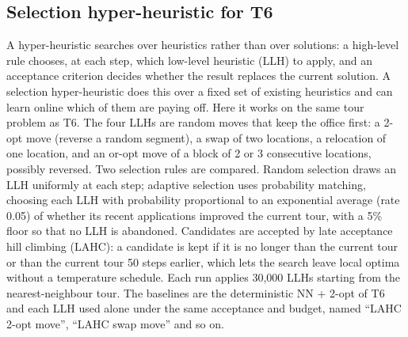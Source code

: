 \subsection{Selection hyper-heuristic for T6}\label{sec:hh-design}
A hyper-heuristic searches over heuristics rather than over solutions: a high-level rule chooses, at each step, which low-level heuristic (LLH) to apply, and an acceptance criterion decides whether the result replaces the current solution. A selection hyper-heuristic does this over a fixed set of existing heuristics and can learn online which of them are paying off. Here it works on the same tour problem as T6. The four LLHs are random moves that keep the office first: a 2-opt move (reverse a random segment), a swap of two locations, a relocation of one location, and an or-opt move of a block of 2 or 3 consecutive locations, possibly reversed. Two selection rules are compared. Random selection draws an LLH uniformly at each step; adaptive selection uses probability matching, choosing each LLH with probability proportional to an exponential average (rate 0.05) of whether its recent applications improved the current tour, with a 5\% floor so that no LLH is abandoned. Candidates are accepted by late acceptance hill climbing (LAHC): a candidate is kept if it is no longer than the current tour or than the current tour 50 steps earlier, which lets the search leave local optima without a temperature schedule. Each run applies 30,000 LLHs starting from the nearest-neighbour tour. The baselines are the deterministic NN + 2-opt of T6 and each LLH used alone under the same acceptance and budget, named ``LAHC 2-opt move'', ``LAHC swap move'' and so on.
